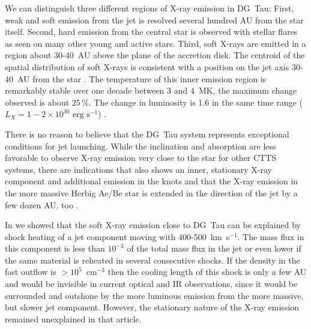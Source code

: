 \documentclass{emulateapj}
\begin{document}
We can distinguish three different regions of X-ray emission in DG~Tau: First, weak and soft emission from the jet is resolved several hundred AU from the star itself. Second, hard emission from the central star is observed with stellar flares as seen on many other young and active stars. Third, soft X-rays are emitted in a region about 30-40~AU above the plane of the accretion disk. The centroid of the spatial distribution of soft X-rays is consistent with a position on the jet axis 30-40~AU from the star \citep{2008A&A...488L..13S,2011ASPC..448..617G}. The temperature of this inner emission region is remarkably stable over one decade between 3 and 4~MK, the maximum change observed is about 25\,\%. The change in luminosity is 1.6 in the same time range ($L_X=1-2\times10^{30}\textrm{ erg s}^{-1}$) \citep{SchneiderDGTauXray}.

There is no reason to believe that the DG~Tau system represents exceptional conditions for jet launching. While the inclination and absorption are less favorable to observe X-ray emission very close to the star for other CTTS systems, there are indications that  also shows an inner, stationary X-ray component and additional emission in the knots \citep{2010A&A...511A..42B,2011A&A...530A.123S} and that the X-ray emission in the more massive Herbig Ae/Be star  is extended in the direction of the jet by a few dozen AU, too \citep{2005ApJ...628..811S,2009A&A...494.1041G,2013A&A...552A.142G}.

In \citet{2009A&A...493..579G} we showed that the soft X-ray emission close to DG~Tau can be explained by shock heating of a jet component moving with 400-500~km~s$^{-1}$. The mass flux in this component is less than $10^{-3}$ of the total mass flux in the jet or even lower if the same material is reheated in several consecutive shocks. If the density in the fast outflow is $>10^5$~cm$^{-3}$ then the cooling length of this shock is only a few AU and would be invisible in current optical and IR observations, since it would be surrounded and outshone by the more luminous emission from the more massive, but slower jet component. However, the stationary nature of the X-ray emission remained unexplained in that article.
\end{document}
